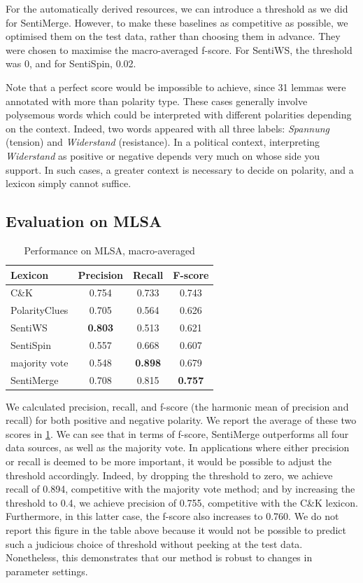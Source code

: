 \documentclass[11pt]{article}
\begin{document}
For the automatically derived resources, we can introduce a threshold as we did for SentiMerge.  However, to make these baselines as competitive as possible, we optimised them on the test data, rather than choosing them in advance.  They were chosen to maximise the macro-averaged f-score.  For SentiWS, the threshold was 0, and for SentiSpin, 0.02.

Note that a perfect score would be impossible to achieve, since 31 lemmas were annotated with more than polarity type. These cases generally involve polysemous words which could be interpreted with different polarities depending on the context. Indeed, two words appeared with all three labels: \emph{Spannung} (tension) and \emph{Widerstand} (resistance).  In a political context, interpreting \emph{Widerstand} as positive or negative depends very much on whose side you support.  In such cases, a greater context is necessary to decide on polarity, and a lexicon simply cannot suffice.

\subsection{Evaluation on MLSA}

\begin{table}[t]
\centering
    \begin{tabular}{|l|ccc|} \hline
	Lexicon        & Precision & Recall       & F-score \\ \hline
	C\&K	& 0.754	& 0.733	& 0.743 \\
	PolarityClues	& 0.705	& 0.564	& 0.626 \\
	SentiWS	& \textbf{0.803}	& 0.513	& 0.621 \\
	SentiSpin	& 0.557	& 0.668	& 0.607 \\ \hline
	majority vote	& 0.548	& \textbf{0.898}	& 0.679 \\
	SentiMerge	& 0.708	& 0.815	& \textbf{0.757} \\ \hline
    \end{tabular}
\caption{Performance on MLSA, macro-averaged}
\label{tab:results}
\end{table}

We calculated precision, recall, and f-score (the harmonic mean of precision and recall) for both positive and negative polarity. We report the average of these two scores in \ref{tab:results}.  We can see that in terms of f-score, SentiMerge outperforms all four data sources, as well as the majority vote.  In applications where either precision or recall is deemed to be more important, it would be possible to adjust the threshold accordingly.  Indeed, by dropping the threshold to zero, we achieve recall of 0.894, competitive with the majority vote method; and by increasing the threshold to 0.4, we achieve precision of 0.755, competitive with the C\&K lexicon.  Furthermore, in this latter case, the f-score also increases to 0.760.  We do not report this figure in the table above because it would not be possible to predict such a judicious choice of threshold without peeking at the test data.  Nonetheless, this demonstrates that our method is robust to changes in parameter settings.
\end{document}

